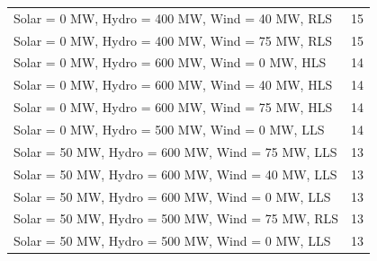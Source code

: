 \documentclass[10pt]{report}
\begin{document}
\begin{table}[H]
{\begin{tabular}{lr}
Solar = 0 MW, Hydro = 400 MW, Wind = 40 MW, RLS & 15 \\
Solar = 0 MW, Hydro = 400 MW, Wind = 75 MW, RLS & 15 \\
Solar = 0 MW, Hydro = 600 MW, Wind = 0 MW, HLS & 14 \\
Solar = 0 MW, Hydro = 600 MW, Wind = 40 MW, HLS & 14 \\
Solar = 0 MW, Hydro = 600 MW, Wind = 75 MW, HLS & 14 \\
Solar = 0 MW, Hydro = 500 MW, Wind = 0 MW, LLS & 14 \\
Solar = 50 MW, Hydro = 600 MW, Wind = 75 MW, LLS & 13 \\
Solar = 50 MW, Hydro = 600 MW, Wind = 40 MW, LLS & 13 \\
Solar = 50 MW, Hydro = 600 MW, Wind = 0 MW, LLS & 13 \\
Solar = 50 MW, Hydro = 500 MW, Wind = 75 MW, RLS & 13 \\
Solar = 50 MW, Hydro = 500 MW, Wind = 0 MW, LLS & 13 \\
\bottomrule
\end{tabular}}
\end{table}
\end{document}
